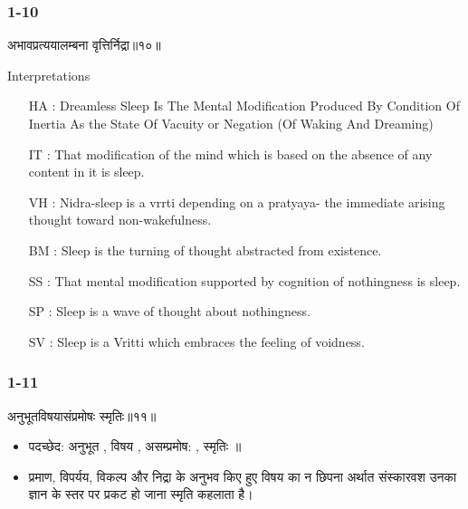 \begin{frame}[fragile]\frametitle{1-10}

\begin{sanskrit}
अभावप्रत्ययालम्बना वृत्तिर्निद्रा॥१०॥
\end{sanskrit}

Interpretations
\begin{itemize}		
\item [HA]: Dreamless Sleep Is The Mental Modification Produced By Condition Of Inertia As the State Of Vacuity or Negation (Of Waking And Dreaming)
\item [IT]: That modification of the mind which is based on the absence of any content in it is sleep.
\item [VH]: Nidra-sleep is a vrrti depending on a pratyaya- the immediate arising thought toward non-wakefulness.
\item [BM]: Sleep is the turning of thought abstracted from existence.
\item [SS]: That mental modification supported by cognition of nothingness is sleep.
\item [SP]: Sleep is a wave of thought about nothingness.
\item [SV]: Sleep is a Vritti which embraces the feeling of voidness. 
\end{itemize}
	
\end{frame}

\begin{frame}[fragile]\frametitle{1-11}
\begin{sanskrit}
अनुभूतविषयासंप्रमोषः स्मृतिः॥११॥
\end{sanskrit}

\begin{itemize}
\item पदच्छेद: अनुभूत , विषय , असम्प्रमोष: , स्मृतिः ॥
\item प्रमाण, विपर्यय, विकल्प और निद्रा के अनुभव किए हुए विषय का न छिपना अर्थात संस्कारवश उनका ज्ञान के स्तर पर प्रकट हो जाना स्मृति कहलाता है।
\end{itemize}
	
\end{frame}

